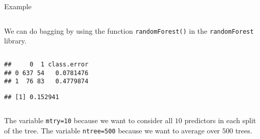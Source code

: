 \documentclass[10pt,ignorenonframetext,]{beamer}
\newenvironment{Shaded}{\begin{snugshade}}{\end{snugshade}}
\newcommand{\DataTypeTok}[1]{\textcolor[rgb]{0.13,0.29,0.53}{#1}}
\newcommand{\DecValTok}[1]{\textcolor[rgb]{0.00,0.00,0.81}{#1}}
\newcommand{\KeywordTok}[1]{\textcolor[rgb]{0.13,0.29,0.53}{\textbf{#1}}}
\newcommand{\NormalTok}[1]{#1}
\newcommand{\OperatorTok}[1]{\textcolor[rgb]{0.81,0.36,0.00}{\textbf{#1}}}
\newcommand{\OtherTok}[1]{\textcolor[rgb]{0.56,0.35,0.01}{#1}}
\newcommand{\StringTok}[1]{\textcolor[rgb]{0.31,0.60,0.02}{#1}}
\begin{document}
\begin{frame}[fragile]

\begin{block}{Example}

\(~\)

We can do bagging by using the function \texttt{randomForest()} in the
\texttt{randomForest} library.

\(~\)

\scriptsize

\begin{Shaded}
\end{Shaded}

\begin{verbatim}
##     0  1 class.error
## 0 637 54   0.0781476
## 1  76 83   0.4779874
\end{verbatim}

\begin{Shaded}
\end{Shaded}

\begin{verbatim}
## [1] 0.152941
\end{verbatim}

\normalsize

\(~\)

The variable \texttt{mtry=10} because we want to consider all \(10\)
predictors in each split of the tree. The variable \texttt{ntree=500}
because we want to average over \(500\) trees.

\end{block}

\end{frame}
\end{document}
